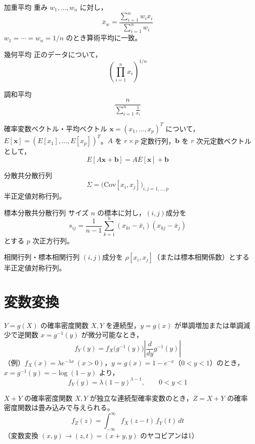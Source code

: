 \documentclass[a4paper,11pt]{ltjsarticle}
\newcommand{\Cov}{\mathrm{Cov}}
\begin{document}
\begin{term}{加重平均}
重み $w_1,\dots,w_n$ に対し，
\[
\bar{x}_w = \frac{\sum_{i=1}^n w_i x_i}{\sum_{i=1}^n w_i}
\]
$w_1=\cdots=w_n=1/n$ のとき算術平均に一致。
\end{term}

\begin{term}{幾何平均}
正のデータについて，
\[
\left(\prod_{i=1}^n x_i\right)^{1/n}
\]
\end{term}

\begin{term}{調和平均}
\[
\frac{n}{\sum_{i=1}^n \frac{1}{x_i}}
\]
\end{term}

\begin{term}{確率変数ベクトル・平均ベクトル}
$\bm{x}=(x_1,\dots,x_p)^T$ について，$E[\bm{x}]=(E[x_1],\dots,E[x_p])^T$。$A$ を $r\times p$ 定数行列，$\bm{b}$ を $r$ 次元定数ベクトルとして，
\[
E[A\bm{x}+\bm{b}] = A E[\bm{x}] + \bm{b}
\]
\end{term}

\begin{term}{分散共分散行列}
\[
\Sigma = \big(\Cov[x_i,x_j]\big)_{i,j=1,\dots,p}
\]
半正定値対称行列。
\end{term}

\begin{term}{標本分散共分散行列}
サイズ $n$ の標本に対し，$(i,j)$成分を
\[
s_{ij} = \frac{1}{n-1}\sum_{k=1}^n (x_{ki}-\bar{x}_i)(x_{kj}-\bar{x}_j)
\]
とする $p$ 次正方行列。
\end{term}

\begin{term}{相関行列・標本相関行列}
$(i,j)$成分を $\rho[x_i,x_j]$（または標本相関係数）とする半正定値対称行列。
\end{term}

\section{変数変換}

\begin{term}{$Y=g(X)$ の確率密度関数}
$X,Y$ を連続型，$y=g(x)$ が単調増加または単調減少で逆関数 $x=g^{-1}(y)$ が微分可能なとき，
\[
f_Y(y) = f_X\big(g^{-1}(y)\big)\left|\frac{d}{dy}g^{-1}(y)\right|
\]
（例）$f_X(x)=\lambda e^{-\lambda x}\ (x>0)$，$y=g(x)=1-e^{-x}$（$0<y<1$）のとき，$x=g^{-1}(y)=-\log(1-y)$ より，
\[
f_Y(y) = \lambda(1-y)^{\lambda-1}, \qquad 0<y<1
\]
\end{term}

\begin{term}{$X+Y$ の確率密度関数}
$X,Y$ が独立な連続型確率変数のとき，$Z=X+Y$ の確率密度関数は畳み込みで与えられる。
\[
f_Z(z) = \int_{-\infty}^{\infty} f_X(z-t)\,f_Y(t)\,dt
\]
（変数変換 $(x,y)\to(z,t)=(x+y,y)$ のヤコビアンは1）
\end{term}
\end{document}
